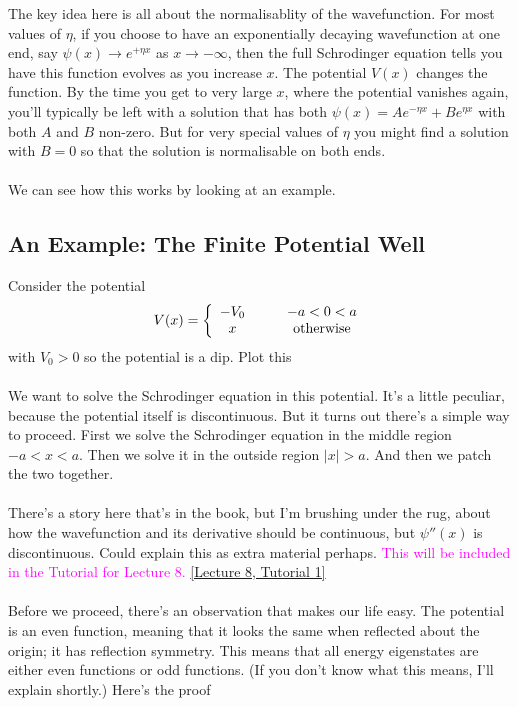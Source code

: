 \documentclass[12pt]{article}
\def\be{\begin{eqnarray}}
\def\ee{\end{eqnarray}}
\newcommand{\nn}{\nonumber}
\newcommand\para{\paragraph{}}
\newcommand{\ra}{\rightarrow}
\newcommand{\co}{\color{olive}}
\newcommand{\cblue}{\color{blue}}
\newcommand{\alyssa}{\textcolor{magenta}}
\begin{document}
The key idea here is all about the normalisablity of the wavefunction.  For most values of $\eta$, if you choose to have an exponentially decaying wavefunction at one end, say $\psi(x) \ra e^{+\eta x}$ as $x\ra -\infty$, then the full Schrodinger equation tells you have this function evolves as you increase $x$. The potential $V(x)$ changes the function. By the time you get to very large $x$, where the potential vanishes again, you'll typically be left with a solution that has both $\psi(x)  = A e^{-\eta x} + Be^{\eta x}$ with both $A$ and $B$ non-zero. But for very special values of $\eta$ you might find a solution with $B=0$ so that the solution is normalisable on both ends. 

\para
We can see how this works by looking at an example.



\subsection{An Example: The Finite Potential Well}

{\co Consider the potential
%
\be V(x) = \left\{\begin{array}{cc} -V_0\ \ \ &\ \ \ -a<0<a\\ x \ \ \ & \ \ \ {\rm otherwise}\end{array}\right.\nn\ee
%
with $V_0>0$ so the potential is a dip.} {\cblue Plot this}

\para
We want to solve the Schrodinger equation in this potential. It's a little peculiar, because the potential itself is discontinuous. But it turns out there's a simple way to proceed. First we solve the Schrodinger equation in the middle region $-a<x<a$. Then we solve it in the outside region $|x|>a$. And then we patch the two together. 


\para
{\cblue There's a story here that's in the book, but I'm brushing under the rug, about how the wavefunction and its derivative should be continuous, but $\psi''(x)$ is discontinuous. Could explain this as extra material perhaps.} \alyssa{This will be included in the Tutorial for Lecture 8.} \href{https://drive.google.com/file/d/1fw8hOjUlY-BsJ0BJx1Xko-qa6W9G8FRz/view?usp=drive_link}{[Lecture 8, Tutorial 1]}

\para
Before we proceed, there's an observation that makes our life easy. The potential is an even function, meaning that it looks the same when reflected about the origin; it has reflection symmetry. This means that all energy eigenstates are either even functions or odd functions. (If you don't know what this means, I'll explain shortly.) Here's the proof
\end{document}
